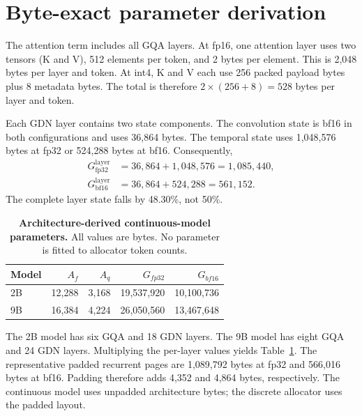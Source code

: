 \documentclass{article}
\begin{document}
\printAffiliationsAndNotice{}

\section{Byte-exact parameter derivation}
\label{app:bytes}

The attention term includes all GQA layers. At fp16, one attention layer uses
two tensors (K and V), 512 elements per token, and 2 bytes per element. This
is 2,048 bytes per layer and token. At int4, K and V each use 256 packed
payload bytes plus 8 metadata bytes. The total is therefore
$2\times(256+8)=528$ bytes per layer and token.

Each GDN layer contains two state components. The convolution state is bf16
in both configurations and uses 36,864 bytes. The temporal state uses
1,048,576 bytes at fp32 or 524,288 bytes at bf16. Consequently,
\begin{align}
G^{\mathrm{layer}}_{\mathrm{fp32}} &= 36{,}864+1{,}048{,}576
 = 1{,}085{,}440,\\
G^{\mathrm{layer}}_{\mathrm{bf16}} &= 36{,}864+524{,}288
 = 561{,}152.
\end{align}
The complete layer state falls by 48.30\%, not 50\%.

\begin{table}[t]
\centering
\small
\caption{\textbf{Architecture-derived continuous-model parameters.} All
values are bytes. No parameter is fitted to allocator token counts.}
\label{tab:parameters}
\setlength{\tabcolsep}{4pt}
\begin{tabular}{lrrrr}
\toprule
Model & $A_f$ & $A_q$ & $G_{fp32}$ & $G_{bf16}$\\
\midrule
2B & 12,288 & 3,168 & 19,537,920 & 10,100,736\\
9B & 16,384 & 4,224 & 26,050,560 & 13,467,648\\
\bottomrule
\end{tabular}
\end{table}

The 2B model has six GQA and 18 GDN layers. The 9B model has eight GQA and
24 GDN layers. Multiplying the per-layer values yields
Table~\ref{tab:parameters}. The representative padded recurrent pages are
1,089,792 bytes at fp32 and 566,016 bytes at bf16. Padding therefore adds
4,352 and 4,864 bytes, respectively. The continuous model uses unpadded
architecture bytes; the discrete allocator uses the padded layout.
\end{document}
